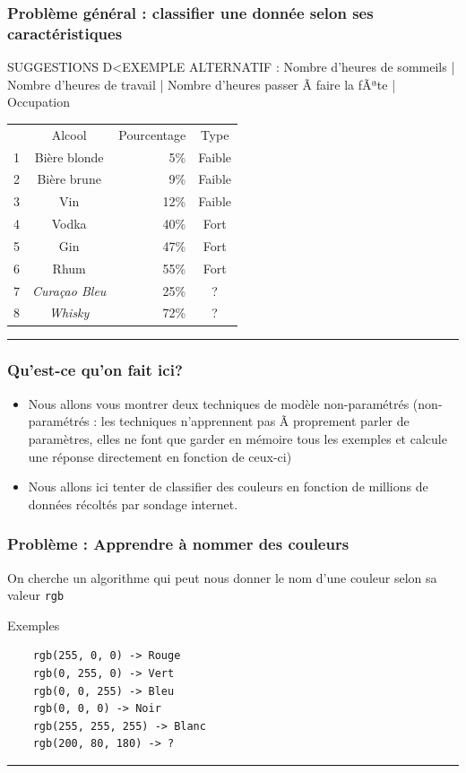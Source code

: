 \documentclass[french]{beamer}
\begin{document}
\begin{frame}[fragile]
\frametitle{Problème général : classifier une donnée selon ses
caractéristiques}

SUGGESTIONS D<EXEMPLE ALTERNATIF : Nombre d'heures de sommeils | Nombre d'heures de travail | Nombre d'heures passer Ã  faire la fÃªte | Occupation 

\begin{center}
\begin{tabular}{rcrc}
& Alcool & Pourcentage & Type\\
1 & Bière blonde & 5\% & Faible
\\
2 & Bière brune & 9\% & Faible
\\
3 & Vin & 12\% & Faible
\\
4 & Vodka & 40\% & Fort
\\
5 & Gin & 47\% & Fort
\\
6 & Rhum & 55\% & Fort
\\
7 & \emph{Curaçao Bleu} & 25\% & ?
\\
8 & \emph{Whisky} & 72\% & ?
\\
\end{tabular}
\end{center}

\begin{center}\rule{3in}{0.4pt}\end{center}
\end{frame}

\begin{frame}
\frametitle{Qu'est-ce qu'on fait ici?}

\begin{itemize}
\item Nous allons vous montrer deux techniques de modèle non-paramétrés (non-paramétrés : les techniques n'apprennent pas Ã  proprement parler de paramètres, elles ne font que garder en mémoire tous les exemples et calcule une réponse directement en fonction de ceux-ci)
\item Nous allons ici tenter de classifier des couleurs en fonction de millions de données récoltés par sondage internet. 
\end{itemize}

\end{frame}


\begin{frame}[fragile]
\frametitle{Problème : Apprendre à nommer des
couleurs}

On cherche un algorithme qui peut nous donner le nom d'une couleur selon
sa valeur \texttt{rgb}

{Exemples}

\begin{verbatim}
    rgb(255, 0, 0) -> Rouge
    rgb(0, 255, 0) -> Vert
    rgb(0, 0, 255) -> Bleu
    rgb(0, 0, 0) -> Noir
    rgb(255, 255, 255) -> Blanc
    rgb(200, 80, 180) -> ?
\end{verbatim}

\begin{center}\rule{3in}{0.4pt}\end{center}
\end{frame}
\end{document}
